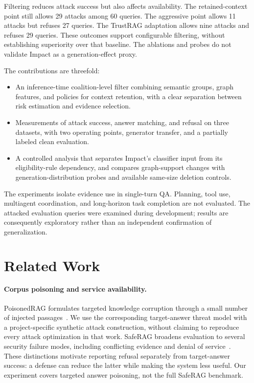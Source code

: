 \documentclass[sigconf]{aamas}
\begin{document}
Filtering reduces attack success but also affects availability. The retained-context point still allows 29 attacks among 60 queries. The aggressive point allows 11 attacks but refuses 27 queries. The TrustRAG adaptation allows nine attacks and refuses 29 queries. These outcomes support configurable filtering, without establishing superiority over that baseline. The ablations and probes do not validate Impact as a generation-effect proxy.

The contributions are threefold:
\begin{itemize}
\item An inference-time coalition-level filter combining semantic groups, graph features, and policies for context retention, with a clear separation between risk estimation and evidence selection.
\item Measurements of attack success, answer matching, and refusal on three datasets, with two operating points, generator transfer, and a partially labeled clean evaluation.
\item A controlled analysis that separates Impact's classifier input from its eligibility-rule dependency, and compares graph-support changes with generation-distribution probes and available same-size deletion controls.
\end{itemize}
The experiments isolate evidence use in single-turn QA. Planning, tool use, multiagent coordination, and long-horizon task completion are not evaluated. The attacked evaluation queries were examined during development; results are consequently exploratory rather than an independent confirmation of generalization.

\section{Related Work}
\paragraph{Corpus poisoning and service availability.}
PoisonedRAG formulates targeted knowledge corruption through a small number of injected passages~\cite{poisonedrag}. We use the corresponding target-answer threat model with a project-specific synthetic attack construction, without claiming to reproduce every attack optimization in that work. SafeRAG broadens evaluation to several security failure modes, including conflicting evidence and denial of service~\cite{saferag}. These distinctions motivate reporting refusal separately from target-answer success: a defense can reduce the latter while making the system less useful. Our experiment covers targeted answer poisoning, not the full SafeRAG benchmark.
\end{document}
